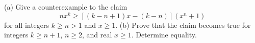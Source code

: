 (a) Give a counterexample to the claim
\[
nx^k\ge[(k-n+1)x-(k-n)](x^n+1)
\]
for all integers $k\ge n>1$ and $x\ge1$.
(b) Prove that the claim becomes true for integers $k\ge n+1$, $n\ge2$, and real $x\ge1$. Determine equality.
